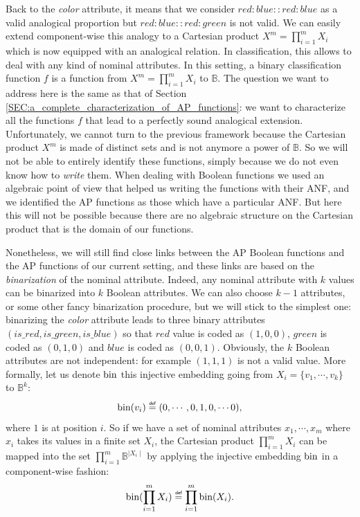 Back to the \textit{color} attribute, it means that we consider
$red:blue::red:blue$ as a valid analogical proportion but $red:blue::red:green$
is not valid. We can easily extend component-wise this analogy to a Cartesian
product $X^m=\prod_{i=1}^m X_i$ which is now equipped with an analogical
relation. In classification, this allows to deal with any kind of nominal
attributes.  In this setting, a binary classification function $f$ is a
function from $X^m=\prod_{i=1}^m X_i$ to $\mathbb{B}$. The question we want to
address here is the same as that of Section
\ref{SEC:a_complete_characterization_of_AP_functions}: we want to characterize all
the functions $f$ that lead to a perfectly sound analogical extension.
Unfortunately, we cannot turn to the previous framework because the Cartesian
product $X^m$ is made of distinct sets and is not anymore a power of
$\mathbb{B}$. So we will not be able to entirely identify these functions,
simply because we do not even know how to \textit{write} them. When dealing
with Boolean functions we used an algebraic point of view that helped us
writing the functions with their ANF, and we identified the AP functions as
those which have a particular ANF. But here this will not be possible because
there are no algebraic structure on the Cartesian product that is the domain of
our functions.

Nonetheless, we will still find close links between the AP Boolean functions
and the AP functions of our current setting, and these links are based on the
\textit{binarization} of the nominal attribute. Indeed, any nominal attribute
with $k$ values can be binarized into $k$ Boolean attributes. We can also choose
$k- 1$ attributes, or some other fancy binarization procedure, but we will
stick to the simplest one:
binarizing the \textit{color} attribute leads to three binary attributes
$(is\_red, is\_green, is\_blue)$ so that $red$ value is coded as $(1, 0, 0)$,
$green$ is coded as $(0, 1 , 0)$ and $blue$ is coded as $(0, 0, 1)$. Obviously,
the $k$ Boolean attributes are not independent: for example $(1, 1, 1)$  is not
a valid value.  More formally, let us denote $\text{bin}$ this injective embedding
going from $X_i=\{v_1, \cdots, v_k\}$ to $\mathbb{B}^k$:
$$\bin(v_i) \eqdef (0, \cdots, 0, 1, 0, \cdots 0),$$
where $1$ is at position $i$.  So if we have a set of nominal attributes $x_1,
\cdots, x_m$ where $x_i$ takes its values in a finite set $X_i$, the Cartesian
product  $\prod_{i=1}^m X_i$ can be mapped into the set $\prod_{i=1}^m
\mathbb{B}^{\mid X_i \mid}$ by applying the injective embedding $\text{bin}$ in a
component-wise fashion:
$$\bin(\prod_{i=1}^m X_i) \eqdef \prod_{i=1}^m  \bin(X_i).$$

